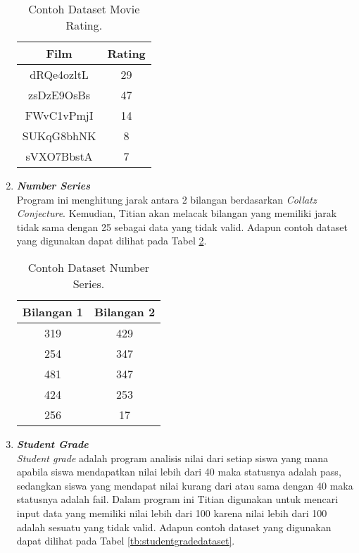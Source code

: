 \begin{enumerate}
            \begin{longtable}{|c|c|}
                  \caption{Contoh Dataset Movie Rating.}
                  \label{tb:movieratingdataset} \\
                  \hline
                  \rowcolor[HTML]{C0C0C0}
                  \textbf{Film} & \textbf{Rating} \\
                  \hline
                  dRQe4ozltL & 29 \\
                  zsDzE9OsBs & 47 \\
                  FWvC1vPmjI & 14 \\
                  SUKqG8bhNK & 8 \\
                  sVXO7BbstA & 7 \\
                  \hline
            \end{longtable}

      \item \emph{\textbf{Number Series}} \\

            Program ini menghitung jarak antara 2 bilangan berdasarkan \emph{Collatz Conjecture}. Kemudian, Titian akan melacak bilangan yang memiliki jarak tidak sama dengan 25 sebagai data yang tidak valid.
            Adapun contoh dataset yang digunakan dapat 
            dilihat pada Tabel \ref{tb:numberseriesdataset}.

            \begin{longtable}{|c|c|}
                  \caption{Contoh Dataset Number Series.}
                  \label{tb:numberseriesdataset} \\
                  \hline
                  \rowcolor[HTML]{C0C0C0}
                  \textbf{Bilangan 1} & \textbf{Bilangan 2} \\
                  \hline
                  319 & 429 \\
                  254 & 347 \\
                  481 & 347 \\
                  424 & 253 \\
                  256 & 17 \\
                  \hline
            \end{longtable}

      \item \emph{\textbf{Student Grade}} \\
            \emph{Student grade} adalah program analisis nilai dari setiap siswa yang mana apabila siswa mendapatkan nilai lebih dari 40 maka statusnya adalah pass, sedangkan siswa yang mendapat nilai kurang dari atau sama dengan 40 maka statusnya adalah fail. Dalam program ini Titian digunakan untuk mencari input data yang memiliki nilai lebih dari 100 karena nilai lebih dari 100 adalah sesuatu yang tidak valid.
            Adapun contoh dataset yang digunakan dapat 
            dilihat pada Tabel \ref{tb:studentgradedataset}.


\end{enumerate}
